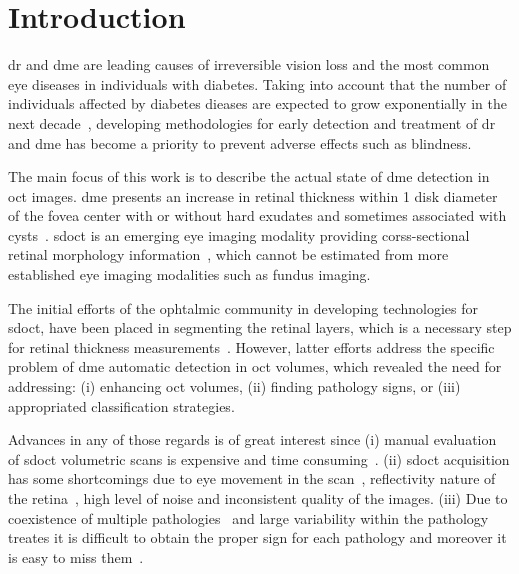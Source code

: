 \graphicspath{ {./content/intro/figures/} }

\section{Introduction}
\label{sec:intro}  %

\gls{dr} and \gls{dme} are leading causes of irreversible vision loss and the most common eye diseases in individuals with diabetes.
Taking into account that the number of individuals affected by diabetes dieases are expected to grow exponentially in the next decade~\cite{wild2004global},
developing methodologies for early detection and treatment of \gls{dr} and \gls{dme} has become a priority to prevent adverse effects such as blindness.

The main focus of this work is to describe the actual state of \gls{dme} detection in \gls{oct} images.
\gls{dme} presents an increase in retinal thickness within 1 disk diameter of the fovea center with or without hard exudates and sometimes associated with cysts~\cite{ETDRSG1985}.
\gls{sdoct} is an emerging eye imaging modality providing corss-sectional retinal morphology information~\cite{Wang2015}, which cannot be estimated from more established eye imaging modalities such as fundus imaging.

The initial efforts of the ophtalmic community in developing technologies for \gls{sdoct}, have been placed in segmenting the retinal layers, which is a necessary step for retinal thickness measurements~\cite{Chiu2010,Kafieh2013}.
However, latter efforts address the specific problem of \gls{dme} automatic detection in \gls{oct} volumes, which revealed the need for addressing: (i) enhancing \gls{oct} volumes, (ii) finding pathology signs, or (iii) appropriated classification strategies.

Advances in any of those regards is of great interest since (i) manual evaluation of \gls{sdoct} volumetric scans is expensive and time consuming~\cite{Venhuizen2015}.
(ii) \gls{sdoct} acquisition has some shortcomings due to eye movement in the scan~\cite{Liu2011}, reflectivity nature of the retina~\cite{schuman2004optical}, high level of noise and inconsistent quality of the images. 
(iii) Due to coexistence of multiple pathologies~\cite{Liu2011} and large variability within the pathology treates it is difficult to obtain the proper sign for each pathology and moreover it is easy to miss them~\cite{Venhuizen2015}.


